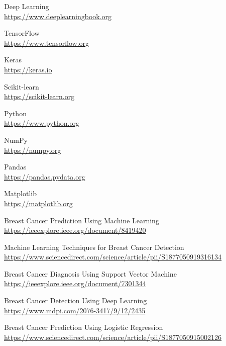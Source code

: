 \documentclass[12pt]{article}
\begin{document}
\begin{enumerate}[label={[\arabic*]}]
    \item Deep Learning \\
    \url{https://www.deeplearningbook.org}
    
    \item TensorFlow \\
    \url{https://www.tensorflow.org}
    
    \item Keras \\
    \url{https://keras.io}
    
    \item Scikit-learn \\
    \url{https://scikit-learn.org}
    
    \item Python \\
    \url{https://www.python.org}
    
    \item NumPy \\
    \url{https://numpy.org}
    
    \item Pandas \\
    \url{https://pandas.pydata.org}
    
    \item Matplotlib \\
    \url{https://matplotlib.org}
    
    \item Breast Cancer Prediction Using Machine Learning \\
    \url{https://ieeexplore.ieee.org/document/8419420}
    
    \item Machine Learning Techniques for Breast Cancer Detection \\
    \url{https://www.sciencedirect.com/science/article/pii/S1877050919316134}
    
    \item Breast Cancer Diagnosis Using Support Vector Machine \\
    \url{https://ieeexplore.ieee.org/document/7301344}
    
    \item Breast Cancer Detection Using Deep Learning \\
    \url{https://www.mdpi.com/2076-3417/9/12/2435}
    
    \item Breast Cancer Prediction Using Logistic Regression \\
    \url{https://www.sciencedirect.com/science/article/pii/S1877050915002126}
    

\end{enumerate}
\end{document}
